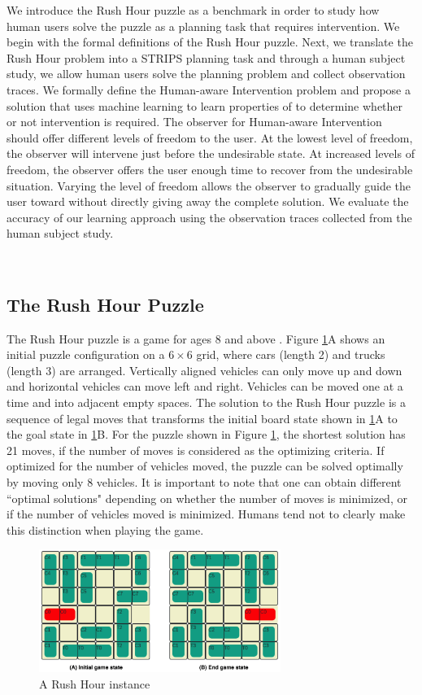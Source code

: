 We introduce the Rush Hour puzzle as a benchmark in order to study how human users solve the puzzle as a planning task that requires intervention.
We begin with the formal definitions of the Rush Hour puzzle.
Next, we translate the Rush Hour problem into a STRIPS planning task and through a human subject study, we allow human users solve the planning problem and collect observation traces.
We formally define the Human-aware Intervention problem and propose a solution that uses machine learning to learn properties of \historyDef to determine whether or not intervention is required.
The observer for Human-aware Intervention should offer different levels of freedom to the user.
At the lowest level of freedom, the observer will intervene just before the undesirable state. 
At increased levels of freedom, the observer offers the user enough time to recover from the undesirable situation.
Varying the level of freedom allows the observer to gradually guide the user toward \desired without directly giving away the complete solution.
We evaluate the accuracy of our learning approach using the observation traces collected from the human subject study.


 

~\subsection{The Rush Hour Puzzle}
The Rush Hour puzzle is a game for ages 8 and above \cite{flake2002}. Figure \ref{fig:game}A shows an initial puzzle configuration on a $6 \times 6$ grid, where cars (length 2) and trucks (length 3) are arranged. 
Vertically aligned vehicles can only move up and down and horizontal vehicles can move left and right. 
Vehicles can be moved one at a time and into adjacent empty spaces. The solution to the Rush Hour puzzle is a sequence of legal moves that transforms the initial board state shown in \ref{fig:game}A to the goal state in \ref{fig:game}B. 
For the puzzle shown in Figure \ref{fig:game}, the shortest solution has 21 moves, if the number of moves is considered as the optimizing criteria. 
If optimized for the number of vehicles moved, the puzzle can be solved optimally by moving only 8 vehicles. 
It is important to note that one can obtain different ``optimal solutions" depending on whether the number of moves is minimized,
or if the number of vehicles moved is minimized.
Humans tend not to clearly make this distinction when playing the game.
\begin{figure}[tpb]
  \centering
    	\includegraphics[width=0.7\textwidth]{img/figure4.jpg}
    	\caption{A Rush Hour instance}
    	\label{fig:game}
\end{figure}

